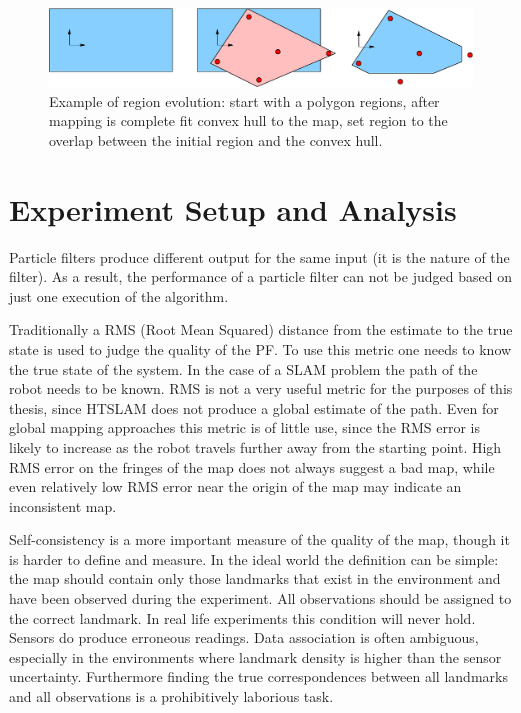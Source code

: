 \begin{figure}[htbp]
  \centering
  \includegraphics[width=14cm]{Pics/fig_convex_reg}
  \caption[Example of region evolution]
  {Example of region evolution: start with a polygon regions,
  after mapping is complete fit convex hull to the map, set region to
  the overlap between the initial region and the convex hull.}
  \label{fig:initial_region_vision}
\end{figure}

\section{Experiment Setup and Analysis}

Particle filters produce different output for the same input (it is
the nature of the filter). As a result, the performance of a particle
filter can not be judged based on just one execution of the
algorithm. 


Traditionally a RMS (Root Mean Squared) distance from the estimate to
the true state is used to judge the quality of the PF. To use this
metric one needs to know the true state of the system. In the case of
a SLAM problem the path of the robot needs to be known. RMS is not a
very useful metric for the purposes of this thesis, since HTSLAM does
not produce a global estimate of the path. Even for global mapping
approaches this metric is of little use, since the RMS error is likely
to increase as the robot travels further away from the starting point.
High RMS error on the fringes of the map does not always suggest a bad
map, while even relatively low RMS error near the origin of the map
may indicate an inconsistent map.

Self-consistency is a more important measure of the quality of the
map, though it is harder to define and measure. In the ideal world the
definition can be simple: the map should contain only those landmarks
that exist in the environment and have been observed during the
experiment. All observations should be assigned to the correct
landmark. In real life experiments this condition will never hold.
Sensors do produce erroneous readings. Data association is often
ambiguous, especially in the environments where landmark density is
higher than the sensor uncertainty. Furthermore finding the true
correspondences between all landmarks and all observations is a
prohibitively laborious task.

